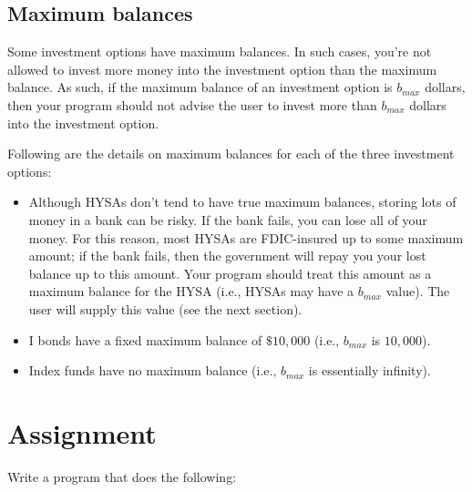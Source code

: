 \documentclass{article}
\begin{document}
\subsection{Maximum balances}

Some investment options have maximum balances. In such cases, you're not allowed to invest more money into the investment option than the maximum balance. As such, if the maximum balance of an investment option is $b_{max}$ dollars, then your program should not advise the user to invest more than $b_{max}$ dollars into the investment option.

Following are the details on maximum balances for each of the three investment options:

\begin{itemize}
    \item Although HYSAs don't tend to have true maximum balances, storing lots of money in a bank can be risky. If the bank fails, you can lose all of your money. For this reason, most HYSAs are FDIC-insured up to some maximum amount; if the bank fails, then the government will repay you your lost balance up to this amount. Your program should treat this amount as a maximum balance for the HYSA (i.e., HYSAs may have a $b_{max}$ value). The user will supply this value (see the next section).
    \item I bonds have a fixed maximum balance of $\$10{,}000$ (i.e., $b_{max}$ is $10{,}000$).
    \item Index funds have no maximum balance (i.e., $b_{max}$ is essentially infinity).
\end{itemize}

\section{Assignment}

Write a program that does the following:
\end{document}
